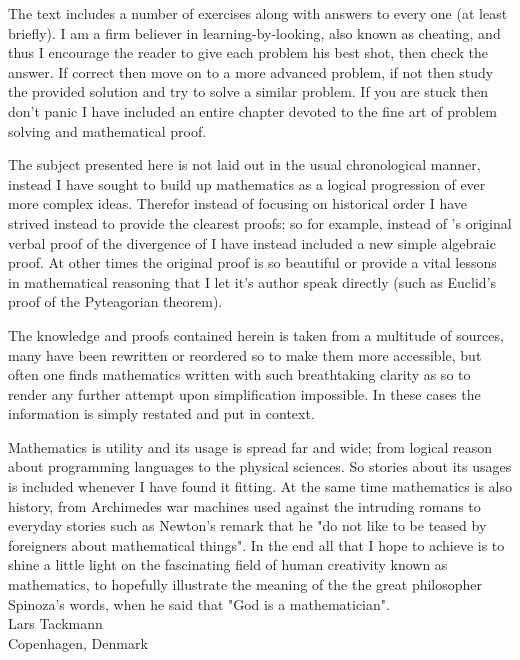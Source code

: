 The text includes a number of exercises along with answers to every one (at least briefly). I am a firm believer in learning-by-looking, also known as cheating, and thus I encourage the reader to give each problem his best shot, then check the answer. If correct then move on to a more advanced problem, if not then study the provided solution and try to solve a similar problem. If you are stuck then don't panic I have included an entire chapter devoted to the fine art of problem solving and mathematical proof.

The subject presented here is not laid out in the usual chronological manner, instead I have sought to build up mathematics as a logical progression of ever more complex ideas. Therefor instead of focusing on historical order I have strived instead to provide the clearest proofs; so for example, instead of 's original verbal proof of the divergence of  I have instead included a new simple algebraic proof. At other times the original proof is so beautiful or provide a vital lessons in mathematical reasoning that I let it's author speak directly (such as Euclid's proof of the Pyteagorian theorem).

The knowledge and proofs contained herein is taken from a multitude of sources, many have been rewritten or reordered so to make them more accessible, but often one finds mathematics written with such breathtaking clarity as so to render any further attempt upon simplification impossible. In these cases the information is simply restated and put in context. 

\indent Mathematics is utility and its usage is spread far and wide; from logical reason about programming languages to the physical sciences. So stories about its usages is included whenever I have found it fitting. At the same time mathematics is also history, from Archimedes war machines used against the intruding romans to everyday stories such as Newton's remark that he "do not like to be teased by foreigners about mathematical things". In the end all that I hope to achieve is to shine a little light on the fascinating field of human creativity known as mathematics, to hopefully illustrate the meaning of the the great philosopher Spinoza's words, when he said that "God is a mathematician". \\
\flushright Lars Tackmann \\ Copenhagen, Denmark\flushleft

